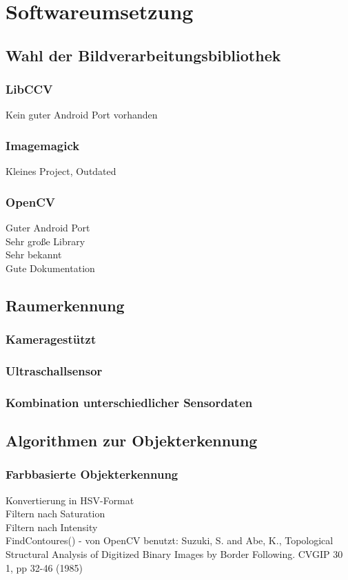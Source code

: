 \chapter{Softwareumsetzung}

\section{Wahl der Bildverarbeitungsbibliothek}
\subsection{LibCCV}
Kein guter Android Port vorhanden
\subsection{Imagemagick}
Kleines Project, Outdated
\subsection{OpenCV}
Guter Android Port\\
Sehr große Library\\
Sehr bekannt\\
Gute Dokumentation\\


\section{Raumerkennung}
\subsection{Kameragestützt}
\subsection{Ultraschallsensor}
\subsection{Kombination unterschiedlicher Sensordaten}

\section{Algorithmen zur Objekterkennung}
\subsection{Farbbasierte Objekterkennung}
Konvertierung in HSV-Format\\
Filtern nach Saturation\\
Filtern nach Intensity\\
FindContoures() - von OpenCV benutzt:
Suzuki, S. and Abe, K., Topological Structural Analysis of Digitized Binary Images by Border Following. CVGIP 30 1, pp 32-46 (1985)

